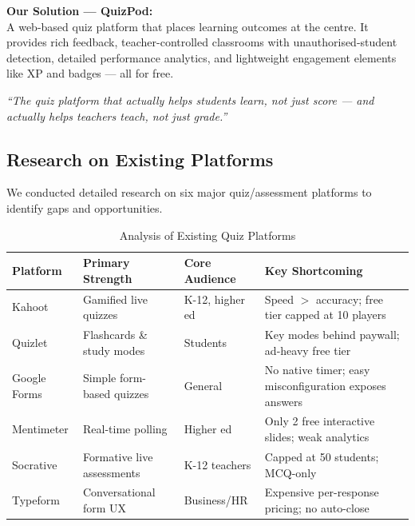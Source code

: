 \documentclass[12pt,a4paper]{article}
\begin{document}
\textbf{Our Solution --- QuizPod:}\\
A web-based quiz platform that places learning outcomes at the centre. It
provides rich feedback, teacher-controlled classrooms with unauthorised-student
detection, detailed performance analytics, and lightweight engagement elements
like XP and badges --- all for free.

\begin{infobox}
  \textit{``The quiz platform that actually helps students learn, not just
  score --- and actually helps teachers teach, not just grade.''}
\end{infobox}

\subsection{Research on Existing Platforms}

We conducted detailed research on six major quiz/assessment platforms to
identify gaps and opportunities.

\begin{table}[H]
  \centering
  \caption{Analysis of Existing Quiz Platforms}
  \small
  \begin{tabularx}{\linewidth}{@{} l l l X @{}}
    \toprule
    \textbf{Platform} & \textbf{Primary Strength} & \textbf{Core Audience} & \textbf{Key Shortcoming} \\
    \midrule
    Kahoot       & Gamified live quizzes    & K-12, higher ed   & Speed $>$ accuracy; free tier capped at 10 players \\
    Quizlet      & Flashcards \& study modes & Students         & Key modes behind paywall; ad-heavy free tier \\
    Google Forms & Simple form-based quizzes & General          & No native timer; easy misconfiguration exposes answers \\
    Mentimeter   & Real-time polling        & Higher ed         & Only 2 free interactive slides; weak analytics \\
    Socrative    & Formative live assessments & K-12 teachers   & Capped at 50 students; MCQ-only \\
    Typeform     & Conversational form UX   & Business/HR       & Expensive per-response pricing; no auto-close \\
    \bottomrule
  \end{tabularx}
\end{table}
\end{document}
